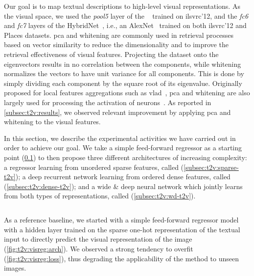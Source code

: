 Our goal is to map textual descriptions to high-level visual representations.
As the visual space, we used the \emph{pool5} layer of the \resnet{}~\cite{he2016deep} trained on \gls{ilsvrc}'12, and the \emph{fc6} and \emph{fc7} layers of the HybridNet~\cite{zhou2014learning}, i.e., an AlexNet~\cite{krizhevsky2012imagenet} trained on both \gls{ilsvrc}'12 and Places datasets.
\acrfull{pca} and whitening are commonly used in retrieval processes based on vector similarity to reduce the dimensionality and to improve the retrieval effectiveness of visual features.
Projecting the dataset onto the eigenvectors results in no correlation between the components, while
whitening normalizes the vectors to have unit variance for all components.
This is done by simply dividing each component by the square root of its eigenvalue.
Originally proposed for local features aggregations such as \gls{vlad}~\cite{jegou2012negative}, \gls{pca} and whitening are also largely used for processing the activation of neurons~\cite{sharif2014cnn,gong2014multi,gordo2016deep}.
As reported in \ref{subsec:t2v:results}, we observed relevant improvement by applying \gls{pca} and whitening to the visual features.

In this section, we describe the experimental activities we have carried out in order to achieve our goal.
We take a simple feed-forward regressor as a starting point (\ref{subsec:t2v:vis-reg}) to then propose three different architectures of increasing complexity: a regressor learning from unordered sparse features, called \sparsettv{} (\ref{subsec:t2v:sparse-t2v}); a deep recurrent network learning from ordered dense features, called \densettv{} (\ref{subsec:t2v:dense-t2v}); and a wide \& deep neural network which jointly learns from both types of representations, called \widedeepttv{} (\ref{subsec:t2v:wd-t2v}).


\subsection{\visreg{}}
\label{subsec:t2v:vis-reg}

As a reference baseline, we started with a simple feed-forward regressor model with a hidden layer trained on the sparse one-hot representation of the textual input to directly predict the visual representation of the image (\ref{fig:t2v:visreg:arch}).
We observed a strong tendency to overfit (\ref{fig:t2v:visreg:loss}), thus degrading the applicability of the method to unseen images.

